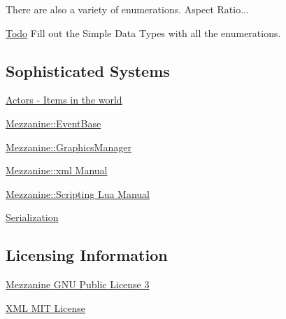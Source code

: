\begin{DoxyParagraph}{There are also a variety of enumerations. Aspect Ratio...}

\end{DoxyParagraph}
\begin{Desc}
\item[\hyperlink{todo__todo000046}{Todo}]Fill out the Simple Data Types with all the enumerations.\end{Desc}
\hypertarget{index_Sophisticated}{}\subsection{Sophisticated Systems}\label{index_Sophisticated}
\hyperlink{classMezzanine_1_1ActorBase}{Actors -\/ Items in the world}

\hyperlink{classMezzanine_1_1EventBase}{Mezzanine::EventBase}

\hyperlink{classMezzanine_1_1GraphicsManager}{Mezzanine::GraphicsManager}

\hyperlink{XMLManual}{Mezzanine::xml Manual}

\hyperlink{LuaManual}{Mezzanine::Scripting Lua Manual}

\hyperlink{Serialization}{Serialization}\hypertarget{index_Licensing}{}\subsection{Licensing Information}\label{index_Licensing}
\hyperlink{GPLLicense}{Mezzanine GNU Public License 3}

\hyperlink{OriginalpugixmlLicense}{XML MIT License} 